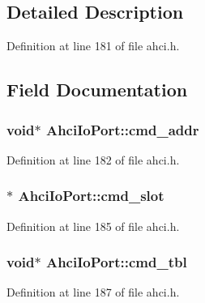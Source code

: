 \subsection{Detailed Description}


Definition at line 181 of file ahci.\+h.



\subsection{Field Documentation}
\subsubsection[{\texorpdfstring{cmd\+\_\+addr}{cmd_addr}}]{\setlength{\rightskip}{0pt plus 5cm}void$\ast$ Ahci\+Io\+Port\+::cmd\+\_\+addr}\hypertarget{structAhciIoPort_ae62df7029d120c6efa10deebede2b1e9}{}\label{structAhciIoPort_ae62df7029d120c6efa10deebede2b1e9}


Definition at line 182 of file ahci.\+h.

\subsubsection[{\texorpdfstring{cmd\+\_\+slot}{cmd_slot}}]{$\ast$ Ahci\+Io\+Port\+::cmd\+\_\+slot}\hypertarget{structAhciIoPort_a428f4de0af81ffd4be8a83cc763bfd27}{}\label{structAhciIoPort_a428f4de0af81ffd4be8a83cc763bfd27}


Definition at line 185 of file ahci.\+h.

\subsubsection[{\texorpdfstring{cmd\+\_\+tbl}{cmd_tbl}}]{\setlength{\rightskip}{0pt plus 5cm}void$\ast$ Ahci\+Io\+Port\+::cmd\+\_\+tbl}\hypertarget{structAhciIoPort_a8768362980d0f4bee31bdce784b28c07}{}\label{structAhciIoPort_a8768362980d0f4bee31bdce784b28c07}


Definition at line 187 of file ahci.\+h.

